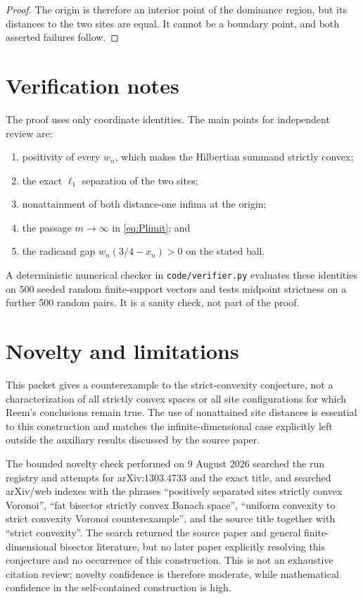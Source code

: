 \documentclass[11pt]{article}
\begin{document}
\begin{proof}
The origin is therefore an interior point of the dominance region, but its distances to the two sites are equal. It cannot be a boundary point, and both asserted failures follow.
\end{proof}

\section{Verification notes}

The proof uses only coordinate identities. The main points for independent review are:
\begin{enumerate}
  \item positivity of every $w_n$, which makes the Hilbertian summand strictly convex;
  \item the exact $\ell_1$ separation of the two sites;
  \item nonattainment of both distance-one infima at the origin;
  \item the passage $m\to\infty$ in \eqref{eq:Plimit}; and
  \item the radicand gap $w_n(3/4-x_n)>0$ on the stated ball.
\end{enumerate}
A deterministic numerical checker in \texttt{code/verifier.py} evaluates these identities on 500 seeded random finite-support vectors and tests midpoint strictness on a further 500 random pairs. It is a sanity check, not part of the proof.

\section{Novelty and limitations}

This packet gives a counterexample to the strict-convexity conjecture, not a characterization of all strictly convex spaces or all site configurations for which Reem's conclusions remain true. The use of nonattained site distances is essential to this construction and matches the infinite-dimensional case explicitly left outside the auxiliary results discussed by the source paper.

The bounded novelty check performed on 9 August 2026 searched the run registry and attempts for arXiv:1303.4733 and the exact title, and searched arXiv/web indexes with the phrases ``positively separated sites strictly convex Voronoi'', ``fat bisector strictly convex Banach space'', ``uniform convexity to strict convexity Voronoi counterexample'', and the source title together with ``strict convexity''. The search returned the source paper and general finite-dimensional bisector literature, but no later paper explicitly resolving this conjecture and no occurrence of this construction. This is not an exhaustive citation review; novelty confidence is therefore moderate, while mathematical confidence in the self-contained construction is high.
\end{document}
